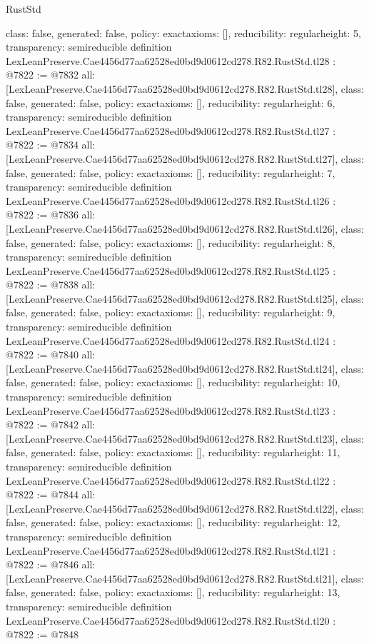 \begin{lexlean}{RustStd}
\begin{coremodule}
{  class: false,
  generated: false,
  policy: exact{axioms: []},
  reducibility: regular{height: 5},
  transparency: semireducible
}
definition LexLeanPreserve.Cae4456d77aa62528ed0bd9d0612cd278.R82.RustStd.tl28 : @7822 := @7832 {
  all: [LexLeanPreserve.Cae4456d77aa62528ed0bd9d0612cd278.R82.RustStd.tl28],
  class: false,
  generated: false,
  policy: exact{axioms: []},
  reducibility: regular{height: 6},
  transparency: semireducible
}
definition LexLeanPreserve.Cae4456d77aa62528ed0bd9d0612cd278.R82.RustStd.tl27 : @7822 := @7834 {
  all: [LexLeanPreserve.Cae4456d77aa62528ed0bd9d0612cd278.R82.RustStd.tl27],
  class: false,
  generated: false,
  policy: exact{axioms: []},
  reducibility: regular{height: 7},
  transparency: semireducible
}
definition LexLeanPreserve.Cae4456d77aa62528ed0bd9d0612cd278.R82.RustStd.tl26 : @7822 := @7836 {
  all: [LexLeanPreserve.Cae4456d77aa62528ed0bd9d0612cd278.R82.RustStd.tl26],
  class: false,
  generated: false,
  policy: exact{axioms: []},
  reducibility: regular{height: 8},
  transparency: semireducible
}
definition LexLeanPreserve.Cae4456d77aa62528ed0bd9d0612cd278.R82.RustStd.tl25 : @7822 := @7838 {
  all: [LexLeanPreserve.Cae4456d77aa62528ed0bd9d0612cd278.R82.RustStd.tl25],
  class: false,
  generated: false,
  policy: exact{axioms: []},
  reducibility: regular{height: 9},
  transparency: semireducible
}
definition LexLeanPreserve.Cae4456d77aa62528ed0bd9d0612cd278.R82.RustStd.tl24 : @7822 := @7840 {
  all: [LexLeanPreserve.Cae4456d77aa62528ed0bd9d0612cd278.R82.RustStd.tl24],
  class: false,
  generated: false,
  policy: exact{axioms: []},
  reducibility: regular{height: 10},
  transparency: semireducible
}
definition LexLeanPreserve.Cae4456d77aa62528ed0bd9d0612cd278.R82.RustStd.tl23 : @7822 := @7842 {
  all: [LexLeanPreserve.Cae4456d77aa62528ed0bd9d0612cd278.R82.RustStd.tl23],
  class: false,
  generated: false,
  policy: exact{axioms: []},
  reducibility: regular{height: 11},
  transparency: semireducible
}
definition LexLeanPreserve.Cae4456d77aa62528ed0bd9d0612cd278.R82.RustStd.tl22 : @7822 := @7844 {
  all: [LexLeanPreserve.Cae4456d77aa62528ed0bd9d0612cd278.R82.RustStd.tl22],
  class: false,
  generated: false,
  policy: exact{axioms: []},
  reducibility: regular{height: 12},
  transparency: semireducible
}
definition LexLeanPreserve.Cae4456d77aa62528ed0bd9d0612cd278.R82.RustStd.tl21 : @7822 := @7846 {
  all: [LexLeanPreserve.Cae4456d77aa62528ed0bd9d0612cd278.R82.RustStd.tl21],
  class: false,
  generated: false,
  policy: exact{axioms: []},
  reducibility: regular{height: 13},
  transparency: semireducible
}
definition LexLeanPreserve.Cae4456d77aa62528ed0bd9d0612cd278.R82.RustStd.tl20 : @7822 := @7848 {
}
\end{coremodule}
\end{lexlean}
